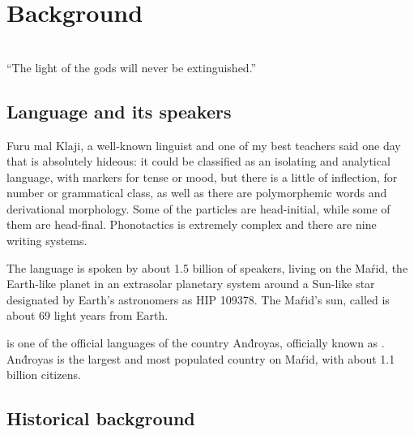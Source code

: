 \chapter{Background}
\label{ch:background}

\begin{flushright}\small
    \\
    ``The light of the gods will never be extinguished.''
\end{flushright}\bigskip

\section{Language and its speakers}

Furu mal Klaji, a well-known linguist and one of my best teachers said one day
that \andro is absolutely hideous: it could be classified as an isolating and
analytical language, with markers for tense or mood, but there is a little of
inflection, for number or grammatical class, as well as there are polymorphemic
words and derivational morphology. Some of the particles are head-initial, while
some of them are head-final. Phonotactics is extremely complex and there are
nine writing systems.

\skipline

The \andro language is spoken by about 1.5 billion of speakers, living on the
Maŕid, the Earth-like planet in an extrasolar planetary system around a Sun-like
star designated by Earth's astronomers as HIP 109378. The Maŕid's sun, called
 is about 69 light years from Earth.

\skipline

\andro is one of the official languages of the country And́royas, officially
known as . And́royas is the
largest and most populated country on Maŕid, with about 1.1 billion citizens.

\section{Historical background}

